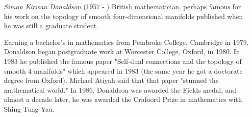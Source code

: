 \documentclass[12pt]{article}
\begin{document}
\emph{Simon Kirwan Donaldson} (1957 - ) British mathematician, perhaps famous for his work on the topology of smooth four-dimensional manifolds published when he was still a graduate student.

Earning a bachelor's in mathematics from Pembroke College, Cambridge in 1979, Donaldson began postgraduate work at Worcester College, Oxford, in 1980. In 1983 he published the famous paper "Self-dual connections and the topology of smooth 4-manifolds" which appeared in 1983 (the same year he got a doctorate degree from Oxford). Michael Atiyah said that that paper "stunned the mathematical world." In 1986, Donaldson was awarded the Fields medal, and almost a decade later, he was awarded the Crafoord Prize in mathematics with Shing-Tung Yau.
\end{document}
